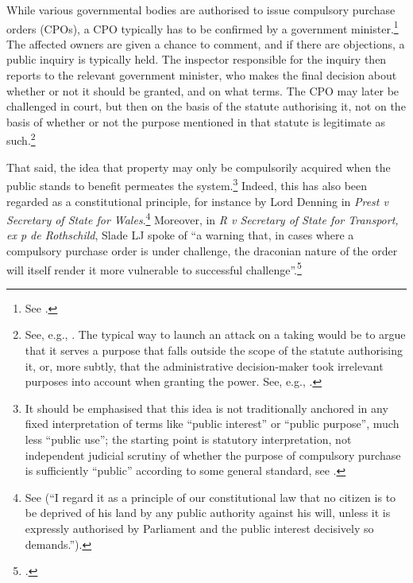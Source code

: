 While various governmental bodies are authorised to issue compulsory purchase orders (CPOs), a CPO typically has to be confirmed by a government minister.\footnote{See \cite[48]{waring09}.} The affected owners are given a chance to comment, and if there are objections, a public inquiry is typically held. The inspector responsible for the inquiry then reports to the relevant government minister, who makes the final decision about whether or not it should be granted, and on what terms. The CPO may later be challenged in court, but then on the basis of the statute authorising it, not on the basis of whether or not the purpose mentioned in that statute is legitimate as such.\footnote{See, e.g., \cite[48-49]{waring09}. The typical way to launch an attack on a taking would be to argue that it serves a purpose that falls outside the scope of the statute authorising it, or, more subtly, that the administrative decision-maker took irrelevant purposes into account when granting the power. See, e.g., \cite{sainsbury10}.}

That said, the idea that property may only be compulsorily acquired when the public stands to benefit permeates the system.\footnote{It should be emphasised that this idea is not traditionally anchored in any fixed interpretation of terms like ``public interest'' or ``public purpose'', much less ``public use''; the starting point is statutory interpretation, not independent judicial scrutiny of whether the purpose of compulsory purchase is sufficiently ``public'' according to some general standard, see \cite[20-24]{allen00}.} Indeed, this has also been regarded as a constitutional principle, for instance by Lord Denning in {\it Prest v Secretary of State for Wales}.\footnote{See \cite[198]{prest82} (``I regard it as a principle of our constitutional law that no citizen is to be deprived of his land by any public authority against his will, unless it is expressly authorised by Parliament and the public interest decisively so demands.'').} Moreover, in {\it R v Secretary of State for Transport, ex p de Rothschild}, Slade LJ spoke of ``a warning that, in cases where a compulsory purchase order is under challenge, the draconian nature of the order will itself render it more vulnerable to successful challenge''.\footcite[938]{rothschild89}

